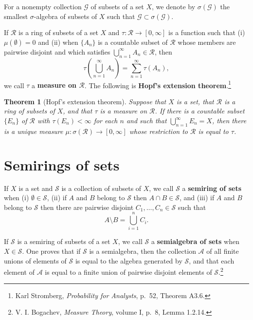 \documentclass{article}
\newtheorem{theorem}{Theorem}
\theoremstyle{definition}
\begin{document}
For a nonempty collection $\mathscr{G}$ of subsets of a set $X$, we denote by $\sigma(\mathscr{G})$ the smallest $\sigma$-algebra
of subsets of $X$ such that $\mathscr{G} \subset \sigma(\mathscr{G})$.

If $\mathscr{R}$ is a ring of subsets of a set $X$ and $\tau:\mathscr{R} \to [0,\infty]$ is a function such that
(i) $\mu(\emptyset)=0$ and (ii) when $\{A_n\}$ is a countable subset of $\mathscr{R}$ whose members are pairwise
disjoint and which satisfies $\bigcup_{n=1}^\infty A_n \in \mathscr{R}$, then
\[
\tau\left( \bigcup_{n=1}^\infty A_n \right) = \sum_{n=1}^\infty \tau(A_n),
\]
we call $\tau$ a \textbf{measure on $\mathscr{R}$}. The following is \textbf{Hopf's extension theorem}.\footnote{Karl Stromberg, {\em Probability for Analysts}, p.~52, Theorem A3.6.}


\begin{theorem}[Hopf's extension theorem]
Suppose that $X$ is a set, that $\mathscr{R}$ is a ring of subsets of $X$, and that $\tau$ is a measure
on $\mathscr{R}$. If there is a countable subset $\{E_n\}$ of $\mathscr{R}$ with $\tau(E_n)<\infty$ for each $n$ and such
that $\bigcup_{n=1}^\infty E_n = X$, then there is a unique measure $\mu:\sigma(\mathscr{R}) \to [0,\infty]$ whose
restriction to $\mathscr{R}$ is equal to $\tau$.
\end{theorem}



\section{Semirings of sets}
If $X$ is a set and $\mathscr{S}$ is a collection of subsets of $X$, we call $\mathscr{S}$ a \textbf{semiring of sets} when
(i) $\emptyset \in \mathscr{S}$, (ii) if $A$ and $B$ belong to $\mathscr{S}$ then $A \cap B \in \mathscr{S}$, and (iii)
if $A$ and $B$ belong to $\mathscr{S}$ then there are pairwise disjoint $C_1,\ldots,C_n \in \mathscr{S}$ such that
\[
A \setminus B = \bigcup_{i=1}^n C_i.
\]

If $\mathscr{S}$ is a semiring of subsets of a set $X$, we call $\mathscr{S}$ a \textbf{semialgebra of sets} when $X \in \mathscr{S}$. One proves
that if $\mathscr{S}$ is a semialgebra, then the collection $\mathscr{A}$ of all finite unions of elements of $\mathscr{S}$ is equal to the algebra
generated by $\mathscr{S}$, and that each element of $\mathscr{A}$ is equal to a finite union of pairwise disjoint elements of $\mathscr{S}$.\footnote{V. I. Bogachev, {\em Measure Theory}, volume I, p.~8, Lemma 1.2.14.} 
\end{document}
